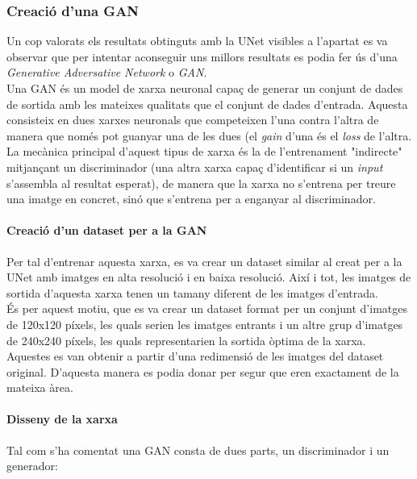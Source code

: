 ﻿\documentclass[10pt,a4paper,twocolumn,twoside]{article}
\begin{document}

\subsubsection{Creació d'una GAN}
Un cop valorats els resultats obtinguts amb la UNet visibles a l'apartat \textit{} es va observar que per intentar aconseguir uns millors resultats es podia fer ús d'una \textit{Generative Adversative Network} o \textit{GAN}.\\

Una GAN \cite{GAN} és un model de xarxa neuronal capaç de generar un conjunt de dades de sortida amb les mateixes qualitats que el conjunt de dades d'entrada. Aquesta consisteix en dues xarxes neuronals que competeixen l'una contra l'altra de manera que només pot guanyar una de les dues (el \textit{gain} d'una és el \textit{loss} de l'altra.\\

La mecànica principal d'aquest tipus de xarxa és la de l'entrenament "indirecte" mitjançant un discriminador (una altra xarxa capaç d'identificar si un \textit{input} s'assembla al resultat esperat), de manera que la xarxa no s'entrena per treure una imatge en concret, sinó que s'entrena per a enganyar al discriminador.\\
\paragraph{Creació d'un dataset per a la GAN}
Per tal d'entrenar aquesta xarxa, es va crear un dataset similar al creat per a la UNet amb imatges en alta resolució i en baixa resolució. Així i tot, les imatges de sortida d'aquesta xarxa tenen un tamany diferent de les imatges d'entrada.\\ És per aquest motiu, que es va crear un dataset format per un conjunt d'imatges de 120x120 píxels, les quals serien les imatges entrants i un altre grup d'imatges de 240x240 píxels, les quals representarien la sortida òptima de la xarxa.\\

Aquestes es van obtenir a partir d'una redimensió de les imatges del dataset original. D'aquesta manera es podia donar per segur que eren exactament de la mateixa àrea.
\paragraph{Disseny de la xarxa}
Tal com s'ha comentat una GAN consta de dues parts, un discriminador i un generador:
\end{document}
